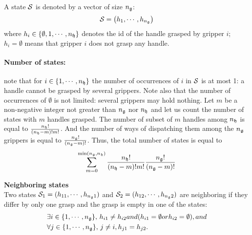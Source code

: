 A state $\mathcal{S}$ is denoted by a vector of size $n_{\mathfrak{g}}$:
\begin{equation}\label{eq:state}
\state = \left(h_1,\cdots,h_{\ngrippers}\right)
\end{equation}
where $h_i\in\{\emptyset,1,\cdots,n_{\mathfrak{h}}\}$ denotes the id of the handle grasped by gripper $i$; $h_i=\emptyset$ means that gripper $i$ does not grasp any handle.

\paragraph{Number of states:} note that for $i\in\{1,\cdots,n_{\mathfrak{h}}\}$ the number of occurrences of $i$ in $\mathcal{S}$ is at most 1: a handle cannot be grasped by several grippers. Note also that the number of occurrences of $\emptyset$ is not limited: several grippers may hold nothing. Let $m$ be a non-negative integer not greater than $n_{\mathfrak{g}}$ nor $n_{\mathfrak{h}}$ and let us count the number of states with $m$ handles grasped. The number of subset of $m$ handles among $n_{\mathfrak{h}}$ is equal to $\frac{n_{\mathfrak{h}}!}{(n_{\mathfrak{h}}-m)!m!}$. And the number of ways of dispatching them among the $n_{\mathfrak{g}}$ grippers is equal to $\frac{n_{\mathfrak{g}}!}{(n_{\mathfrak{g}}-m)!}$. Thus, the total number of states is equal to
$$
\sum_{m=0}^{\min(n_{\mathfrak{g}},n_{\mathfrak{h}})} \frac{n_{\mathfrak{h}}!}{(n_{\mathfrak{h}}-m)!m!} \frac{n_{\mathfrak{g}}!}{(n_{\mathfrak{g}}-m)!}
$$
\begin{definition}\label{def:neighboring-states}\textbf{Neighboring states}\\
  Two states $\mathcal{S}_1=(h_{1 1},\cdots,h_{n_{\mathfrak{g}} 1})$ and $\mathcal{S}_2=(h_{1 2},\cdots,h_{n_{\mathfrak{g}} 2})$ are neighboring if they differ by only one grasp and the grasp is empty in one of the states:
  \begin{align*}
    &\exists i\in\{1,\cdots,n_{\mathfrak{g}}\},\,h_{i 1} \not= h_{i 2} \relax{ and } (h_{i 1}=\emptyset \relax{ or } h_{i 2}=\emptyset), \relax{ and }\\
    &\forall j\in\{1,\cdots,n_{\mathfrak{g}}\},\, j\not=i,h_{j 1} = h_{j 2}.
  \end{align*}
\end{definition}
